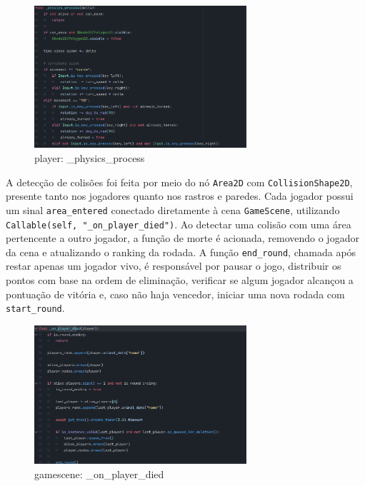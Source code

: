 \begin{figure}[htbp]
    \centering
    \caption{player: \_physics\_process}
    \label{fig:gamascene_pp}
    \includegraphics[width=0.7\textwidth]{figuras/player_process.png}
\end{figure}

A detecção de colisões foi feita por meio do nó \texttt{Area2D} com \texttt{CollisionShape2D}, presente tanto nos jogadores quanto nos rastros e paredes. Cada jogador possui um sinal \texttt{area\_entered} conectado diretamente à cena \texttt{GameScene}, utilizando \texttt{Callable(self, "\_on\_player\_died")}. Ao detectar uma colisão com uma área pertencente a outro jogador, a função de morte é acionada, removendo o jogador da cena e atualizando o ranking da rodada. A função \texttt{end\_round}, chamada após restar apenas um jogador vivo, é responsável por pausar o jogo, distribuir os pontos com base na ordem de eliminação, verificar se algum jogador alcançou a pontuação de vitória e, caso não haja vencedor, iniciar uma nova rodada com \texttt{start\_round}.

\begin{figure}[htbp]
    \centering
    \caption{gamescene: \_on\_player\_died}
    \label{fig:on_player_died}
    \includegraphics[width=0.7\textwidth]{figuras/game_body.png}
\end{figure}

